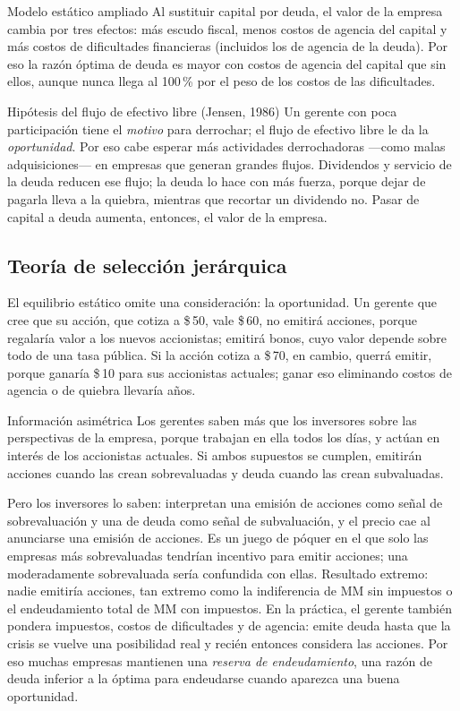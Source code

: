 \begin{definicion}{Modelo estático ampliado}
Al sustituir capital por deuda, el valor de la empresa cambia por tres efectos: más escudo fiscal, menos costos de agencia del capital y más costos de dificultades financieras (incluidos los de agencia de la deuda). Por eso la razón óptima de deuda es mayor con costos de agencia del capital que sin ellos, aunque nunca llega al 100\,\% por el peso de los costos de las dificultades.
\end{definicion}

\begin{definicion}{Hipótesis del flujo de efectivo libre (Jensen, 1986)}
Un gerente con poca participación tiene el \emph{motivo} para derrochar; el flujo de efectivo libre le da la \emph{oportunidad}. Por eso cabe esperar más actividades derrochadoras —como malas adquisiciones— en empresas que generan grandes flujos. Dividendos y servicio de la deuda reducen ese flujo; la deuda lo hace con más fuerza, porque dejar de pagarla lleva a la quiebra, mientras que recortar un dividendo no. Pasar de capital a deuda aumenta, entonces, el valor de la empresa.
\end{definicion}

\subsection{Teoría de selección jerárquica}

El equilibrio estático omite una consideración: la oportunidad. Un gerente que cree que su acción, que cotiza a \$\,50, vale \$\,60, no emitirá acciones, porque regalaría valor a los nuevos accionistas; emitirá bonos, cuyo valor depende sobre todo de una tasa pública. Si la acción cotiza a \$\,70, en cambio, querrá emitir, porque ganaría \$\,10 para sus accionistas actuales; ganar eso eliminando costos de agencia o de quiebra llevaría años.

\begin{definicion}{Información asimétrica}
Los gerentes saben más que los inversores sobre las perspectivas de la empresa, porque trabajan en ella todos los días, y actúan en interés de los accionistas actuales. Si ambos supuestos se cumplen, emitirán acciones cuando las crean sobrevaluadas y deuda cuando las crean subvaluadas.
\end{definicion}

Pero los inversores lo saben: interpretan una emisión de acciones como señal de sobrevaluación y una de deuda como señal de subvaluación, y el precio cae al anunciarse una emisión de acciones. Es un juego de póquer en el que solo las empresas más sobrevaluadas tendrían incentivo para emitir acciones; una moderadamente sobrevaluada sería confundida con ellas. Resultado extremo: nadie emitiría acciones, tan extremo como la indiferencia de MM sin impuestos o el endeudamiento total de MM con impuestos. En la práctica, el gerente también pondera impuestos, costos de dificultades y de agencia: emite deuda hasta que la crisis se vuelve una posibilidad real y recién entonces considera las acciones. Por eso muchas empresas mantienen una \emph{reserva de endeudamiento}, una razón de deuda inferior a la óptima para endeudarse cuando aparezca una buena oportunidad.

